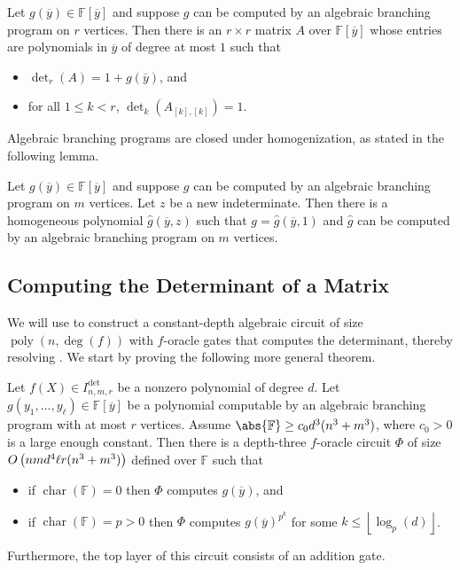 \documentclass[10pt,a4paper]{amsart}
\DeclareMathOperator{\characteristic}{char}
\DeclareMathOperator{\poly}{poly}
\newcommand*\F{\mathbb{F}}
\newcommand*\floor[1]{%
    \left\lfloor #1 \right\rfloor
}
\newcommand*\bigO[1]{%
    O\kern-0.0pt\left(#1\right)
}
\begin{document}
\begin{lem}\label{lem:ABP_to_det}
  Let $g(\overline{y}) \in \F[\overline{y}]$ and suppose $g$ can be computed by an algebraic branching program on $r$ vertices.
  Then there is an $r \times r$ matrix $A$ over $\F[\overline{y}]$ whose entries are polynomials in $\overline{y}$ of degree at most $1$ such that
  \begin{itemize}
    \item $\det_r(A) = 1 + g(\overline{y})$, and
    \item for all $1 \leq k < r$, $\det_k(A_{[k], [k]}) = 1$.
  \end{itemize}
\end{lem}

Algebraic branching programs are closed under homogenization, as stated in the following lemma.

\begin{lem}[{\cite[Lemma 3.7]{AF21}}]\label{lem:homog_ABP}
  Let $g(\overline{y}) \in \F[\overline{y}]$ and suppose $g$ can be computed by an algebraic branching program on $m$ vertices.
  Let $z$ be a new indeterminate.
  Then there is a homogeneous polynomial $\widehat{g}(\overline{y}, z)$ such that $g = \widehat{g}(\overline{y}, 1)$ and $\widehat{g}$ can be computed by an algebraic branching program on $m$ vertices.
\end{lem}

\subsection{Computing the Determinant of a Matrix} 


We will use  to construct a constant-depth algebraic circuit of size $\poly(n,\deg(f))$ with $f$-oracle gates that computes the determinant, thereby resolving . We start by proving the following more general theorem.

\begin{thrm}\label{thrm:ABP_det_oracle}
    Let $f(X) \in I^{\det}_{n, m, r}$ be a nonzero polynomial of degree $d$.
    Let $g(y_1, \ldots, y_\ell) \in \F[\overline{y}]$ be a polynomial computable by an algebraic branching program with at most $r$ vertices.
    Assume $\abs{\F} \geq c_0 d^3(n^3+m^3)$, where $c_0>0$ is a large enough constant.
    Then there is a depth-three $f$-oracle circuit $\Phi$ of size $\bigO{nmd^4\ell r(n^3+m^3)}$ defined over $\F$ such that 
    \begin{itemize}
        \item if $\characteristic(\F) = 0$ then $\Phi$ computes $g(\overline{y})$, and
        \item if $\characteristic(\F) = p > 0$ then $\Phi$ computes $g(\overline{y})^{p^k}$ for some $k \leq \floor{\log_p(d)}$.
    \end{itemize}
    Furthermore, the top layer of this circuit consists of an addition gate.
\end{thrm}
\end{document}
